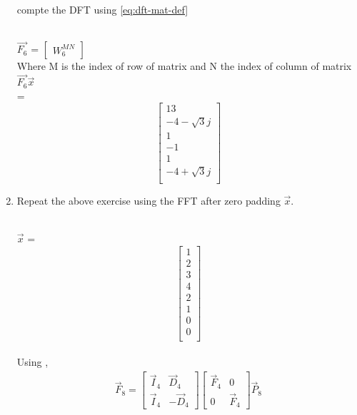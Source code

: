 \documentclass[journal,12pt,twocolumn]{IEEEtran}
\renewcommand\thesection{\arabic{section}}
\begin{document}
\begin{enumerate}[label=\arabic*.,ref=\thesection.\theenumi]
    compte the DFT  
		using 
	    \eqref{eq:dft-mat-def}
\\
\begin{solution}
	\\$\vec{F_6}$ = $\begin{bmatrix}W_6^{MN}\end{bmatrix}$
	\\Where M is the index of row of matrix and N the index of column of matrix
	\\$\vec{F_6}\vec{x}$
	\\ =
	\begin{equation}
		\begin{bmatrix}
			13 \\
			-4-\sqrt{3}j \\
			1 \\
			-1 \\
			1 \\
			-4 + \sqrt{3}j \\
		\end{bmatrix}
	\end{equation}
\end{solution}
    \item Repeat the above exercise using the FFT
	    after zero padding $\vec{x}$.
\\
\begin{solution}
	\\$\vec{x}$ = 
	\begin{equation}
		\begin{bmatrix}
			1 \\
			2 \\
			3 \\
			4 \\
			2 \\
			1 \\
			0 \\
			0 \\
		\end{bmatrix}
	\end{equation}
	\\
	Using ,
	\begin{align}
	\vec{F}_{8}=
	\begin{bmatrix}
	\vec{I}_{4} & \vec{D}_{4} \\
	\vec{I}_{4} & -\vec{D}_{4}
	\end{bmatrix}
	\begin{bmatrix}
	\vec{F}_{4} & 0 \\
	0 & \vec{F}_{4}
	\end{bmatrix}
	\vec{P}_{8}\\

\end{align}
\end{solution}
\end{enumerate}
\end{document}
